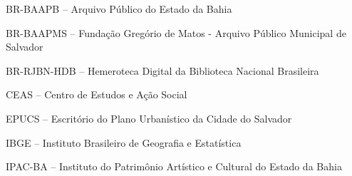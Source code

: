 \begin{siglas}
\item BR-BAAPB -- Arquivo Público do Estado da Bahia
\item BR-BAAPMS -- Fundação Gregório de Matos - Arquivo Público Municipal de Salvador
\item BR-RJBN-HDB -- Hemeroteca Digital da Biblioteca Nacional Brasileira
\item CEAS -- Centro de Estudos e Ação Social
\item EPUCS -- Escritório do Plano Urbanístico da Cidade do Salvador
\item IBGE -- Instituto Brasileiro de Geografia e Estatística
\item IPAC-BA -- Instituto do Patrimônio Artístico e Cultural do Estado da Bahia
\end{siglas}